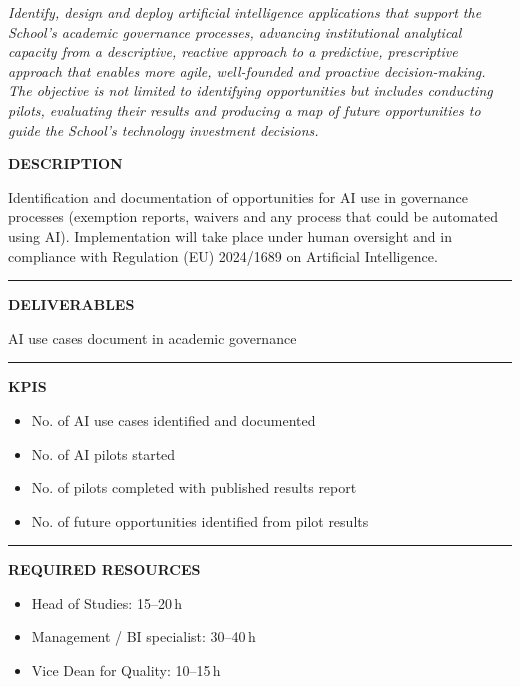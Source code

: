 \documentclass[11pt,a4paper]{scrreprt}
\newcommand{\fieldlabel}[1]{%
  {\footnotesize\sffamily\bfseries\color{mutedcolor}\MakeUppercase{#1}}\par\nopagebreak[4]
}
\newcommand{\fieldsep}{\vspace{3pt}\noindent\textcolor{bordercolor}{\rule{\linewidth}{0.4pt}}\vspace{3pt}\par}
\begin{document}
\newpage
{}
{\small\color{mutedcolor}\itshape Identify, design and deploy artificial intelligence applications that support the School's academic governance processes, advancing institutional analytical capacity from a descriptive, reactive approach to a predictive, prescriptive approach that enables more agile, well-founded and proactive decision-making. The objective is not limited to identifying opportunities but includes conducting pilots, evaluating their results and producing a map of future opportunities to guide the School's technology investment decisions.}\par\vspace{6pt}

\begin{tcolorbox}[pabox={gobcolor}{A.P.4.1 \enspace\textbullet\enspace Identification and Deployment of AI Applications in Academic Governance}]

\fieldlabel{Description}
{\small Identification and documentation of opportunities for AI use in governance processes (exemption reports, waivers and any process that could be automated using AI). Implementation will take place under human oversight and in compliance with Regulation (EU) 2024/1689 on Artificial Intelligence.}\par
\fieldsep
\fieldlabel{Deliverables}
{\small AI use cases document in academic governance}\par
\fieldsep
\fieldlabel{KPIs}
{\small \begin{itemize}[noitemsep,topsep=2pt]
\item No. of AI use cases identified and documented
\item No. of AI pilots started
\item No. of pilots completed with published results report
\item No. of future opportunities identified from pilot results
\end{itemize}}\par
\fieldsep
\fieldlabel{Required Resources}
{\small \begin{itemize}[noitemsep,topsep=2pt]
\item Head of Studies: 15--20\,h
\item Management / BI specialist: 30--40\,h
\item Vice Dean for Quality: 10--15\,h
\end{itemize}}\par
\end{tcolorbox}
\end{document}
